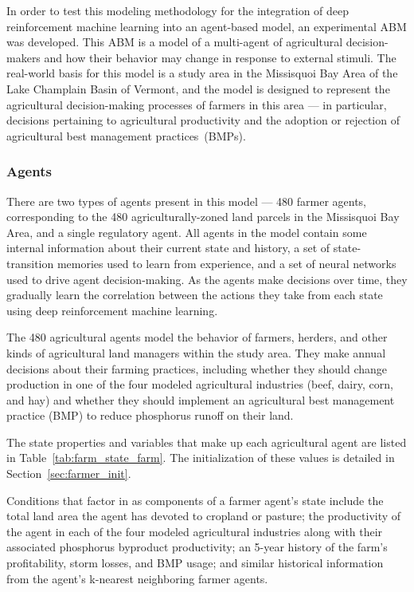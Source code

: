 In order to test this modeling methodology for the integration
of deep reinforcement machine learning into an agent-based model,
an experimental ABM was developed.
This ABM is a model of a multi-agent of agricultural decision-makers
and how their behavior may change in response to external stimuli.
The real-world basis for this model is a study area in the
Missisquoi Bay Area of the Lake Champlain Basin of Vermont,
and the model is designed to represent the agricultural decision-making
processes of farmers in this area ---
in particular, decisions pertaining to agricultural productivity
and the adoption or rejection of agricultural best management practices~(BMPs).

\subsubsection{Agents}

There are two types of agents present in this model --- 480 farmer agents, 
corresponding to the 480 agriculturally-zoned land parcels in the
Missisquoi Bay Area, 
and a single regulatory agent.
All agents in the model contain some internal information 
about their current state and history,
a set of state-transition memories used to learn from experience,
and a set of neural networks used to drive agent decision-making. 
As the agents make decisions over time, 
they gradually learn the correlation between 
the actions they take from each state using deep reinforcement machine 
learning.

The 480 agricultural agents model the behavior of farmers, herders,
and other kinds of agricultural land managers within the study area.
They make annual decisions about their farming practices, 
including whether they should change production in 
one of the four modeled agricultural industries 
(beef, dairy, corn, and hay) and whether they should implement 
an agricultural best management practice (BMP) to reduce 
phosphorus runoff on their land.

The state properties and variables that make up each agricultural agent
are listed in Table~\ref{tab:farm_state_farm}.
The initialization of these values is detailed in
Section~\ref{sec:farmer_init}.

Conditions that factor in as components of a farmer agent's state 
include the total land area the agent has devoted to cropland or pasture; 
the productivity of the agent in each of the four modeled agricultural 
industries along with their associated phosphorus byproduct productivity; 
an 5-year history of the farm's profitability, storm losses, and BMP usage; 
and similar historical information from the agent's k-nearest neighboring
farmer agents.

